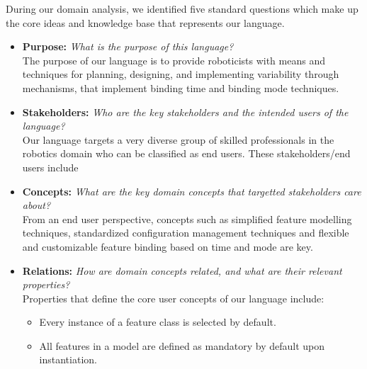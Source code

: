 \documentclass[conference]{IEEEtran}
\begin{document}
During our domain analysis, we identified five standard questions which make up the core ideas and knowledge base that represents our language. 
    \begin{itemize}
        \item \textbf{Purpose: } \textit{What is the purpose of this language?}\\
        The purpose of our language is to provide roboticists with means and techniques for planning, designing, and implementing variability through mechanisms, that implement binding time and binding mode techniques.
        \item \textbf{Stakeholders: } \textit{Who are the key stakeholders and the intended users of the language?}\\ Our language targets a very diverse group of skilled professionals in the robotics domain who can be classified as end users. These stakeholders/end users include 
        \item \textbf{Concepts: }\textit{What are the key domain concepts that targetted stakeholders care about?}\\ From an end user perspective, concepts such as simplified feature modelling techniques, standardized configuration management techniques and flexible and customizable feature binding based on time and mode are key.
        \item \textbf{Relations: }\textit{How are domain concepts related, and what are their relevant properties?}\\
        Properties that define the core user concepts of our language include:
        \begin{itemize}
            \item Every instance of a feature class is selected by default.
            \item All features in a model are defined as mandatory by default upon instantiation.

\end{itemize}
\end{itemize}
\end{document}

